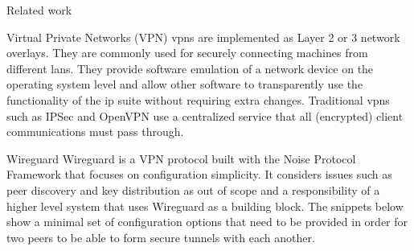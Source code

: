 \begin{frame}[fragile]{Related work}
\begin{block}{Virtual Private Networks (VPN)}
\protect\hypertarget{virtual-private-networks-vpn}{}
\glspl{vpn} are implemented as Layer 2 or 3 network overlays. They are
commonly used for securely connecting machines from different
\glspl{lan}. They provide software emulation of a network device on the
operating system level and allow other software to transparently use the
functionality of the \gls{ip} suite without requiring extra changes.
Traditional \glspl{vpn} such as IPSec\autocite{ipSecDocs} and
OpenVPN\autocite{openVPNDocs} use a centralized service that all
(encrypted) client communications must pass through.

\begin{block}{Wireguard}
\protect\hypertarget{wireguard}{}
Wireguard\autocite{donenfeldWireGuardNextGeneration2017} is a VPN
protocol built with the Noise Protocol Framework\autocite{noiseProtocol}
that focuses on configuration simplicity. It considers issues such as
peer discovery and key distribution as out of scope and a responsibility
of a higher level system that uses Wireguard as a building block. The
snippets below show a minimal set of configuration options that need to
be provided in order for two peers to be able to form secure tunnels
with each another.

\begin{Shaded}
\begin{Highlighting}[]
\KeywordTok{[}\KeywordTok{]}
 \OperatorTok{=} \ErrorTok{/}
 \OperatorTok{=} 
 \OperatorTok{=} \OperatorTok{=}

\KeywordTok{[}\KeywordTok{]}
 \OperatorTok{=} \ErrorTok{+}\ErrorTok{+}\ErrorTok{/}\ErrorTok{+}\OperatorTok{=}
 \OperatorTok{=} \ErrorTok{/}
 \OperatorTok{=} \ErrorTok{:}
\end{Highlighting}
\end{Shaded}


\end{block}
\end{block}
\end{frame}

